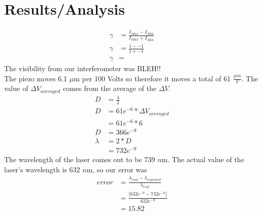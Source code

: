 \section{Results/Analysis}
\begin{align*}
	\gamma &= \frac{I_{Max} - I_{Min}}{I_{Max} + I_{Min}} \\
	\gamma &= \frac{1 - -1}{1 + -1} \\
	\gamma &= 
\end{align*} 
The visibility from our interferometer was BLEH!! \\
The piezo moves 6.1 $\mu$m per 100 Volts so therefore it moves a total of 61 $\frac{\mu m}{V}$.
The value of $\Delta V_{averaged}$ comes from the average of the $\Delta V$.
\begin{align*}
	D &= \frac{\lambda}{2} \\
	D &= 61e^{-6} * \Delta V_{averaged} \\
	  &= 61e^{-6} * 6 \\
	D &= 366e^{-9} \\
	\lambda &= 2*D \\
	 &= 732e^{-9}	
\end{align*}
The wavelength of the laser comes out to be 739 $n$m. The actual value of the laser's wavelength is 632 $n$m, so our error was 
	\begin{align*}
		error &=\frac{\lambda_{real}-\lambda_{expected}}{\lambda_{real}} \\
			&= \frac{|632e^{-9}-732e^{-9}|}{632e^{-9}}	\\	
			&= 15.82
	\end{align*}
